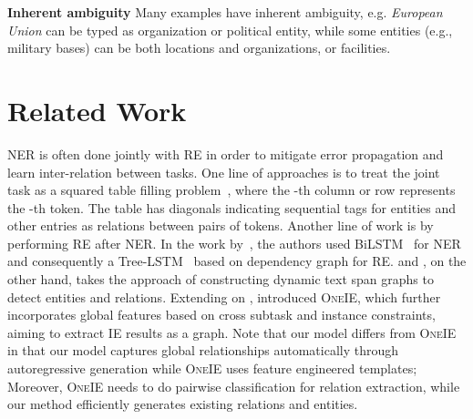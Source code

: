 \documentclass[11pt,a4paper]{article}
\begin{document}
\noindent \textbf{Inherent ambiguity} Many examples have inherent ambiguity, e.g.   \textit{European Union} can be typed as organization or 
political entity, while some entities (e.g., military bases) can be both locations and organizations, or facilities.

































\section{Related Work}












NER is often done jointly with RE in order to mitigate error propagation and learn inter-relation between tasks. One line of approaches is to treat the joint task as a squared table filling problem~\cite{tse_prior, tse_prior2, tse}, where the -th column or row represents the -th token. The table has diagonals indicating sequential tags for entities and other entries as relations between pairs of tokens. Another line of work is by performing RE after NER. In the work by~\citet{bilstm_joint}, the authors used BiLSTM~\cite{bilstm_original} for NER and consequently a Tree-LSTM~\cite{treelstm} based on dependency graph for RE. \citet{dygie} and \citet{dygie_original}, on the other hand, takes the approach of constructing dynamic text span graphs to detect entities and relations. Extending on \citet{dygie}, \citet{lin-etal-2020-joint} introduced \textsc{One}IE, which further incorporates global features based on cross subtask and instance constraints, aiming to extract IE results as a  graph. Note that our model differs from \textsc{One}IE~\cite{lin-etal-2020-joint} in that our model captures global relationships automatically through autoregressive generation while \textsc{One}IE uses feature engineered templates; 
Moreover, \textsc{One}IE needs to do pairwise classification for relation extraction, while our method efficiently generates existing relations and entities. 
\end{document}
